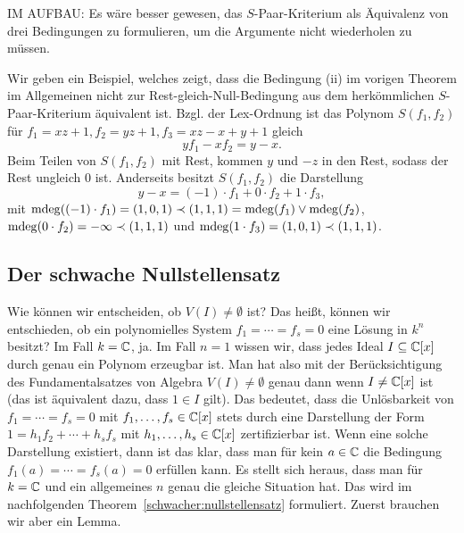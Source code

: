 \documentclass[11pt]{article}
\numberwithin{equation}{section}
\begin{document}
IM AUFBAU: Es wäre besser gewesen, das $S$-Paar-Kriterium als Äquivalenz von drei Bedingungen zu formulieren, um die Argumente nicht wiederholen zu müssen. 

\begin{beispiel}
	Wir geben ein Beispiel, welches zeigt, dass die Bedingung (ii) im vorigen Theorem im Allgemeinen nicht zur Rest-gleich-Null-Bedingung aus dem herkömmlichen $S$-Paar-Kriterium äquivalent ist. Bzgl. der Lex-Ordnung ist das Polynom $S(f_1,f_2)$ für $f_1 = xz + 1, f_2 = yz + 1, f_3 = xz - x + y + 1$ gleich 
	\[
			y f_1 - x f_2 = y - x. 
	\]
	Beim Teilen von $S(f_1,f_2)$ mit Rest, kommen $y$ und $-z$ in den Rest, sodass der Rest ungleich $0$ ist. Anderseits besitzt $S(f_1,f_2)$ die Darstellung 
	\[
			y - x =  (-1) \cdot f_1 + 0 \cdot f_2 + 1 \cdot f_3,
	\]
	mit $\operatorname{mdeg}( (-1) \cdot f_1) = (1,0,1) \prec (1,1,1) = \operatorname{mdeg}(f_1) \vee \operatorname{mdeg}(f_2)$, $\operatorname{mdeg}( 0 \cdot f_2 ) = -\infty \prec (1,1,1)$ und $\operatorname{mdeg}( 1 \cdot f_3) = (1,0,1) \prec (1,1,1)$. 
	
\end{beispiel} 

\subsection{Der schwache Nullstellensatz} 

Wie können wir entscheiden, ob $V(I) \ne \emptyset$ ist? Das heißt, können wir entschieden, ob ein polynomielles System $f_1 = \cdots = f_s = 0$ eine Lösung in $k^n$ besitzt? Im Fall $k = \mathbb{C}$, ja. Im Fall $n=1$ wissen wir, dass jedes Ideal $I \subseteq \mathbb{C}[x]$ durch genau ein Polynom erzeugbar ist. Man hat  also mit der Berücksichtigung des Fundamentalsatzes von Algebra $V(I) \ne \emptyset$ genau dann wenn $I \ne \mathbb{C}[x]$ ist (das ist äquivalent dazu, dass $1 \in I$ gilt). Das bedeutet, dass die Unlösbarkeit von $f_1 = \cdots = f_s = 0$ mit $f_1,\ldots,f_s \in \mathbb{C}[x]$ stets durch eine Darstellung der Form $1 = h_1 f_2 + \cdots + h_s f_s$ mit $h_1,\ldots, h_s \in \mathbb{C}[x]$ zertifizierbar ist. Wenn eine solche Darstellung existiert, dann ist das klar, dass man für kein $a \in \mathbb{C}$ die Bedingung $f_1(a) = \cdots = f_s(a) = 0$ erfüllen kann. Es stellt sich heraus, dass man für $k=\mathbb{C}$ und ein allgemeines $n$ genau die gleiche Situation hat. Das wird im nachfolgenden Theorem~\ref{schwacher:nullstellensatz} formuliert. Zuerst brauchen wir aber ein Lemma. 
\end{document}
